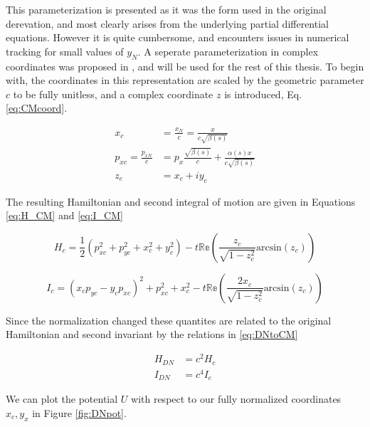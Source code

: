 This parameterization is presented as it was the form used in the original derevation, and most clearly arises from the underlying partial differential equations. However it is quite cumbersome, and encounters issues in numerical tracking for small values of $y_N$. A seperate parameterization in complex coordinates was proposed in \cite{Mitchell}, and will be used for the rest of this thesis. To begin with, the coordinates in this representation are scaled by the geometric parameter $c$ to be fully unitless, and a complex coordinate $z$ is introduced, Eq. \ref{eq:CMcoord}.

\begin{equation} \label{eq:CMcoord}
\begin{split}
	x_c &= \frac{x_N}{c} = \frac{x}{c\sqrt{\beta(s)}}\\
	p_{xc} = \frac{p_{xN}}{c} &= p_x\frac{\sqrt{\beta(s)}}{c} + \frac{\alpha(s)x}{c\sqrt{\beta(s)}}\\
	z_c &= x_c + iy_c
\end{split}
\end{equation}

The resulting Hamiltonian and second integral of motion are given in Equations \ref{eq:H_CM} and \ref{eq:I_CM}

\begin{equation} \label{eq:H_CM}
H_c = \frac{1}{2}\left( p_{xc}^2 + p_{yc}^2 + x_c^2 + y_c^2 \right) - t \mathbb{Re}\left(\frac{z_c}{\sqrt{1-z_c^2}}\textrm{arcsin}(z_c)\right)
\end{equation}

\begin{equation} \label{eq:I_CM}
I_c = (x_c p_{yc} - y_c p_{xc})^2 + p_{xc}^2 + x_c^2 - t\mathbb{Re}\left(\frac{2 x_c}{\sqrt{1-z_c^2}}\textrm{arcsin}(z_c)\right)
\end{equation}

Since the normalization changed these quantites are related to the original Hamiltonian and second invariant by the relations in \ref{eq:DNtoCM}

\begin{equation} \label{eq:DNtoCM}
\begin{split}
	H_{DN} &= c^2 H_c \\
	I_{DN} &= c^4 I_c
\end{split}
\end{equation}

We can plot the potential $U$ with respect to our fully normalized coordinates $x_c,y_x$ in Figure \ref{fig:DNpot}.

